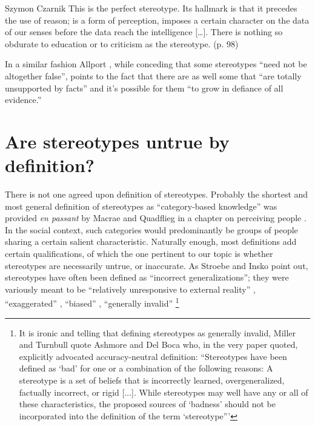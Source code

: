 \begin{artengenv}{Szymon Czarnik}
{This is the perfect stereotype. Its hallmark is that it precedes the use of reason; is a form of perception, imposes a certain character on the data of our senses before the data reach the intelligence […]. There is nothing so obdurate to education or to criticism as the stereotype. (p. 98)
}

In a similar fashion Allport
\parencite*[][pp.189–190]{allport_nature_1954}, %
 while conceding that some stereotypes ``need not be altogether false'', points to the fact that there are as well some that ``are totally unsupported by facts'' and it's possible for them ``to grow in defiance of all evidence.''

\section{Are stereotypes untrue by definition?}
There is not one agreed upon definition of stereotypes. Probably the shortest and most general definition of stereotypes as ``category-based knowledge'' was provided \textit{en passant} by Macrae and Quadflieg in a chapter on perceiving people
\parencite[][p.428]{macrae_perceiving_2010}. %
 In the social context, such categories would predominantly be groups of people sharing a certain salient characteristic. Naturally enough, most definitions add certain qualifications, of which the one pertinent to our topic is whether stereotypes are necessarily untrue, or inaccurate. As Stroebe and Insko 
\parencite*[][]{stroebe_stereotype_1989} %
 point out, stereotypes have often been defined as ``incorrect generalizations''; they were variously meant to be ``relatively unresponsive to external reality'' 
\parencite[][]{klineberg_scientific_1951}, %
 ``exaggerated'' 
\parencite[][]{allport_nature_1954}, %
 ``biased'' 
\parencite[][]{english_comprehensive_1958}, %
 ``generally invalid'' 
\parencite[][]{miller_expectancies_1986}%
\footnote{It is ironic and telling that defining stereotypes as generally invalid, Miller and Turnbull quote Ashmore and Del Boca 
\parencite*[][]{hamilton_conceptual_1981} %
 who, in the very paper quoted, explicitly advocated accuracy-neutral definition: ``Stereotypes have been defined as ‘bad' for one or a combination of the following reasons: A stereotype is a set of beliefs that is incorrectly learned, overgeneralized, factually incorrect, or rigid [...]. While stereotypes may well have any or all of these characteristics, the proposed sources of ‘badness' should not be incorporated into the definition of the term ‘stereotype''' 
}
\end{artengenv}
